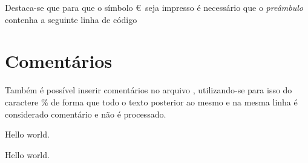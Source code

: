 Destaca-se que para que o símbolo \euro \ seja impresso é necessário que o \textit{preâmbulo} contenha a seguinte linha de código
\begin{latexcode}
    \usepackage[official]{eurosym}
\end{latexcode}

\section{Comentários}
Também é possível inserir comentários no arquivo , utilizando-se para isso do caractere \% de forma que todo o texto posterior ao mesmo e na mesma linha é considerado comentário e não é processado. \\
\begin{minipage}[t]{0.47\linewidth} \vspace{-8pt}
    \begin{latexcode}
        Hello world.%
    \end{latexcode}
\end{minipage} \hfill
\begin{minipage}[t]{0.47\linewidth} \vspace{0pt}
    Hello world.%
\end{minipage}
